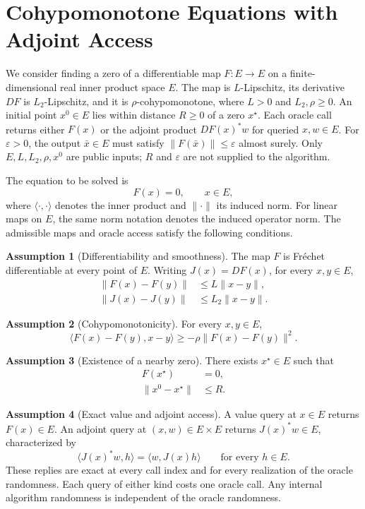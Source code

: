 \documentclass[10pt]{article}
\theoremstyle{definition}
\newtheorem{assumption}{Assumption}
\begin{document}
\section*{Cohypomonotone Equations with Adjoint Access}
We consider finding a zero of a differentiable map $F:E\to E$ on a finite-dimensional real inner product space $E$. The map is $L$-Lipschitz, its derivative $DF$ is $L_2$-Lipschitz, and it is $\rho$-cohypomonotone, where $L>0$ and $L_2,\rho\geq0$. An initial point $x^0\in E$ lies within distance $R\geq0$ of a zero $x^\star$. Each oracle call returns either $F(x)$ or the adjoint product $DF(x)^*w$ for queried $x,w\in E$. For $\varepsilon>0$, the output $\bar{x}\in E$ must satisfy $\|F(\bar{x})\|\leq\varepsilon$ almost surely. Only $E,L,L_2,\rho,x^0$ are public inputs; $R$ and $\varepsilon$ are not supplied to the algorithm.

The equation to be solved is
\[
F(x)=0,\qquad x\in E,
\]
where $\langle\cdot,\cdot\rangle$ denotes the inner product and $\|\cdot\|$ its induced norm. For linear maps on $E$, the same norm notation denotes the induced operator norm. The admissible maps and oracle access satisfy the following conditions.

\begin{assumption}[Differentiability and smoothness]
The map $F$ is Fr\'echet differentiable at every point of $E$. Writing $J(x)=DF(x)$, for every $x,y\in E$,
\[
\begin{aligned}
\|F(x)-F(y)\| &\leq L\|x-y\|,\\
\|J(x)-J(y)\| &\leq L_2\|x-y\|.
\end{aligned}
\]
\end{assumption}

\begin{assumption}[Cohypomonotonicity]
For every $x,y\in E$,
\[
\langle F(x)-F(y),x-y\rangle
\geq -\rho\|F(x)-F(y)\|^2.
\]
\end{assumption}

\begin{assumption}[Existence of a nearby zero]
There exists $x^\star\in E$ such that
\[
\begin{aligned}
F(x^\star)&=0,\\
\|x^0-x^\star\|&\leq R.
\end{aligned}
\]
\end{assumption}

\begin{assumption}[Exact value and adjoint access]
A value query at $x\in E$ returns $F(x)\in E$. An adjoint query at $(x,w)\in E\times E$ returns $J(x)^*w\in E$, characterized by
\[
\langle J(x)^*w,h\rangle=\langle w,J(x)h\rangle
\qquad\text{for every }h\in E.
\]
These replies are exact at every call index and for every realization of the oracle randomness. Each query of either kind costs one oracle call. Any internal algorithm randomness is independent of the oracle randomness.
\end{assumption}
\end{document}
